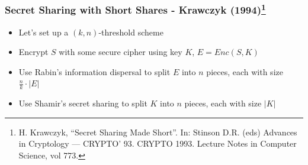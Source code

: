 \documentclass{beamer}
\begin{document}
\begin{frame}
	\frametitle{Secret Sharing with Short Shares - Krawczyk (1994)\footnote{H. Krawczyk, ``Secret Sharing Made Short''. In: Stinson D.R. (eds) Advances in Cryptology — CRYPTO’ 93. CRYPTO 1993. Lecture Notes in Computer Science, vol 773.}}
	\begin{itemize}
		\item Let's set up a $(k,n)$-threshold scheme\pause
		\item Encrypt $S$ with some secure cipher using key $K$, $E = Enc(S,K)$\pause
		\item Use Rabin's information dispersal to split $E$ into $n$ pieces, each with size $\frac{n}{k}\cdot |E|$\pause
		\item Use Shamir's secret sharing to split $K$ into $n$ pieces, each with size $|K|$
	\end{itemize}
\end{frame}
\end{document}
